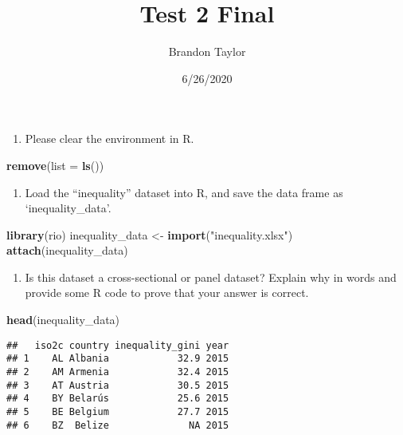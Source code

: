 \documentclass[
]{article}
\title{Test 2 Final}
\author{Brandon Taylor}
\date{6/26/2020}
\newenvironment{Shaded}{\begin{snugshade}}{\end{snugshade}}
\newcommand{\DataTypeTok}[1]{\textcolor[rgb]{0.13,0.29,0.53}{#1}}
\newcommand{\KeywordTok}[1]{\textcolor[rgb]{0.13,0.29,0.53}{\textbf{#1}}}
\newcommand{\NormalTok}[1]{#1}
\newcommand{\StringTok}[1]{\textcolor[rgb]{0.31,0.60,0.02}{#1}}
\providecommand{\tightlist}{%
  \setlength{\itemsep}{0pt}\setlength{\parskip}{0pt}}
\begin{document}
\maketitle

\begin{enumerate}
\def\labelenumi{\arabic{enumi}.}
\tightlist
\item
  Please clear the environment in R.
\end{enumerate}

\begin{Shaded}
\begin{Highlighting}[]
\KeywordTok{remove}\NormalTok{(}\DataTypeTok{list =} \KeywordTok{ls}\NormalTok{())}
\end{Highlighting}
\end{Shaded}

\begin{enumerate}
\def\labelenumi{\arabic{enumi}.}
\setcounter{enumi}{1}
\tightlist
\item
  Load the ``inequality'' dataset into R, and save the data frame as
  `inequality\_data'.
\end{enumerate}

\begin{Shaded}
\begin{Highlighting}[]
\KeywordTok{library}\NormalTok{(rio)}
\NormalTok{inequality_data <-}\StringTok{ }\KeywordTok{import}\NormalTok{(}\StringTok{"inequality.xlsx"}\NormalTok{)}
\KeywordTok{attach}\NormalTok{(inequality_data)}
\end{Highlighting}
\end{Shaded}

\begin{enumerate}
\def\labelenumi{\arabic{enumi}.}
\setcounter{enumi}{2}
\tightlist
\item
  Is this dataset a cross-sectional or panel dataset? Explain why in
  words and provide some R code to prove that your answer is correct.
\end{enumerate}

\begin{Shaded}
\begin{Highlighting}[]
\KeywordTok{head}\NormalTok{(inequality_data)}
\end{Highlighting}
\end{Shaded}

\begin{verbatim}
##   iso2c country inequality_gini year
## 1    AL Albania            32.9 2015
## 2    AM Armenia            32.4 2015
## 3    AT Austria            30.5 2015
## 4    BY Belarús            25.6 2015
## 5    BE Belgium            27.7 2015
## 6    BZ  Belize              NA 2015
\end{verbatim}
\end{document}
